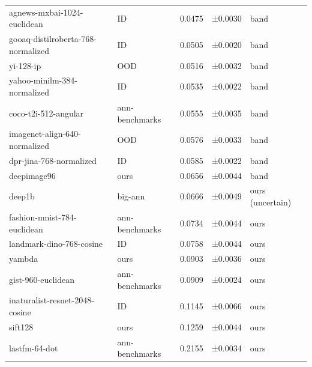 \begin{tabular}{llrrl}
agnews-mxbai-1024-euclidean & ID & 0.0475 & ±0.0030 & band \\
gooaq-distilroberta-768-normalized & ID & 0.0505 & ±0.0020 & band \\
yi-128-ip & OOD & 0.0516 & ±0.0032 & band \\
yahoo-minilm-384-normalized & ID & 0.0535 & ±0.0022 & band \\
coco-t2i-512-angular & ann-benchmarks & 0.0555 & ±0.0035 & band \\
imagenet-align-640-normalized & OOD & 0.0576 & ±0.0033 & band \\
dpr-jina-768-normalized & ID & 0.0585 & ±0.0022 & band \\
deepimage96 & ours & 0.0656 & ±0.0044 & band \\
deep1b & big-ann & 0.0666 & ±0.0049 & ours (uncertain) \\
fashion-mnist-784-euclidean & ann-benchmarks & 0.0734 & ±0.0044 & ours \\
landmark-dino-768-cosine & ID & 0.0758 & ±0.0044 & ours \\
yambda & ours & 0.0903 & ±0.0036 & ours \\
gist-960-euclidean & ann-benchmarks & 0.0909 & ±0.0024 & ours \\
inaturalist-resnet-2048-cosine & ID & 0.1145 & ±0.0066 & ours \\
sift128 & ours & 0.1259 & ±0.0044 & ours \\
lastfm-64-dot & ann-benchmarks & 0.2155 & ±0.0034 & ours \\
\bottomrule
\end{tabular}
